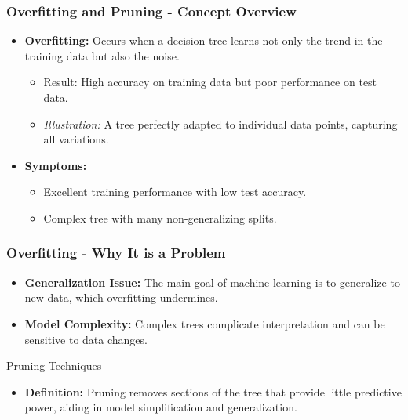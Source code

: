 \documentclass[aspectratio=169]{beamer}
\begin{document}
\begin{frame}[fragile]
    \frametitle{Overfitting and Pruning - Concept Overview}
    \begin{itemize}
        \item \textbf{Overfitting:} Occurs when a decision tree learns not only the trend in the training data but also the noise.
        \begin{itemize}
            \item Result: High accuracy on training data but poor performance on test data.
            \item \textit{Illustration:} A tree perfectly adapted to individual data points, capturing all variations.
        \end{itemize}
        \item \textbf{Symptoms:}
        \begin{itemize}
            \item Excellent training performance with low test accuracy.
            \item Complex tree with many non-generalizing splits.
        \end{itemize}
    \end{itemize}
\end{frame}

\begin{frame}[fragile]
    \frametitle{Overfitting - Why It is a Problem}
    \begin{itemize}
        \item \textbf{Generalization Issue:} The main goal of machine learning is to generalize to new data, which overfitting undermines.
        \item \textbf{Model Complexity:} Complex trees complicate interpretation and can be sensitive to data changes.
    \end{itemize}
    
    \begin{block}{Pruning Techniques}
        \begin{itemize}
            \item \textbf{Definition:} Pruning removes sections of the tree that provide little predictive power, aiding in model simplification and generalization.
        \end{itemize}
    \end{block}
\end{frame}
\end{document}
